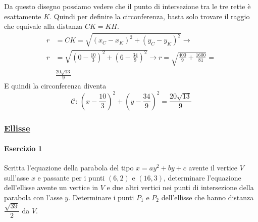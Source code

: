 Da questo disegno possiamo vedere che il punto di intersezione tra le tre rette è esattamente $K$.
Quindi per definire la circonferenza, basta solo trovare il raggio che equivale alla distanza $CK=KH$.
\begin{align*}
  r &= CK = \sqrt{(x_C-x_K)^2+(y_C-y_K)^2} \rightarrow \\
  r &= \sqrt{\left(0-\frac{10}{3}\right)^2+\left(6-\frac{34}{9}\right)^2} \rightarrow
  r = \sqrt{\frac{400}{9}+\frac{1600}{81}} = \\&\frac{20\sqrt{13}}{9}
\end{align*}
E quindi la circonferenza diventa
\begin{equation*}
  \boxed{
    \mathscr{C}:\,\left(x-\frac{10}{3}\right)^2+\left(y-\frac{34}{9}\right)^2=\frac{20\sqrt{13}}{9}
  }
\end{equation*}

\subsubsection*{\hyperref[subsec:geomanal:ellisse]{Ellisse}}\label{ex:ellisse}
\paragraph{Esercizio 1}
Scritta l'equazione della parabola del tipo $x=ay^2+by+c$ avente il vertice $V$ sull'asse $x$ e 
passante per i punti $(6,2)$ e $(16,3)$, determinare l'equazione dell'ellisse avente un vertice in
$V$ e due altri vertici nei punti di intersezione della parabola con l'asse $y$. Determinare i punti
$P_1$ e $P_2$ dell'ellisse che hanno distanza $\dfrac{\sqrt{39}}{2}$ da $V$.
\divisor

